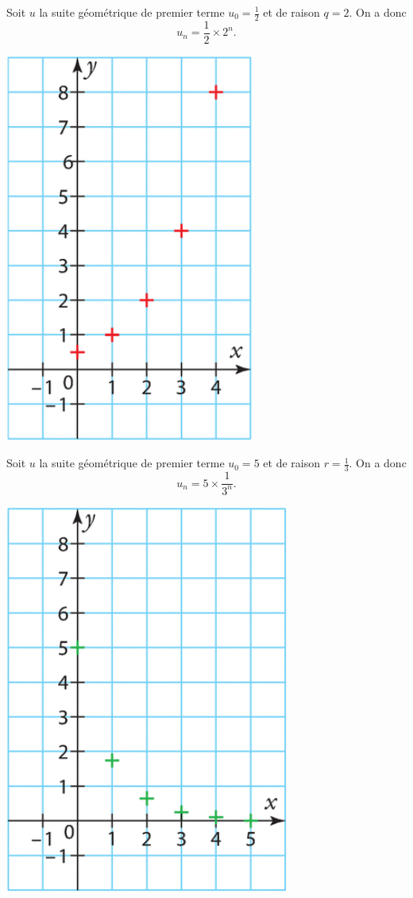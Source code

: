 \documentclass[11pt]{article}
\begin{document}
\begin{exemple}
  \begin{minipage}{.45\textwidth}
    Soit $u$ la suite géométrique de premier terme $u_0=\frac{1}{2}$ et de
    raison $q=2$.
    On a donc
    \[
      u_n = \frac{1}{2}\times2^n.
    \]
    \begin{center}
      \includegraphics[scale=.6]{croissant.png}
    \end{center}
  \end{minipage}
  \hfill
  \begin{minipage}{.45\textwidth}
    Soit $u$ la suite géométrique de premier terme $u_0=5$ et de raison
    $r=\frac{1}{3}$.
    On a donc
    \[
      u_n = 5\times \frac{1}{3^n}.
    \]
    \begin{center}
      \includegraphics[scale=.6]{decroissant.png}

\end{center}
\end{minipage}
\end{exemple}
\end{document}
